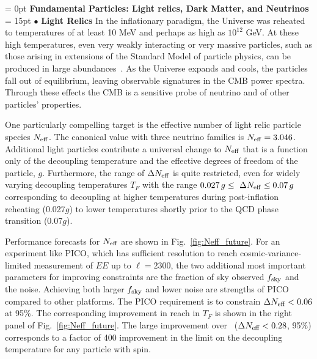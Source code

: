 \documentclass[PICOReport.tex]{subfiles}
\begin{document}
\vspace{0.1in}
\parindent = 0pt
{\bf Fundamental Particles: Light relics, Dark Matter, and Neutrinos} \\ %
\parindent = 15pt
$\bullet$ {\bf Light Relics} \hspace{0.1in} In the inflationary paradigm, the Universe was reheated to temperatures of 
at least 10 MeV and perhaps as 
high as $10^{12}$ GeV.  At these high temperatures, even very weakly interacting or very massive particles, 
such as those arising in extensions of the Standard Model of particle physics, can be produced in large 
abundances~\cite{1979ARNPS..29..313S,Bolz:2000fu}.  As the Universe expands and cools, 
the particles fall out of equilibrium, leaving observable signatures in the CMB power spectra. 
Through these effects the CMB is a sensitive probe of neutrino and of other particles' properties.  


One particularly compelling target is the effective number of light relic particle species ${N_{\rm eff}}$. The canonical value with three neutrino families is ${N_{\rm eff}} = 3.046$. Additional light particles contribute a universal change to ${N_{\rm eff}}$ that is a function only of the decoupling temperature and the effective degrees of freedom of the particle, $g$. Furthermore, the range of $\Delta{N_{\rm eff}}$ is quite restricted, even for widely varying decoupling temperatures $T_{F}$ with the range $ 0.027\,g \leq \ \Delta {N_{\rm eff}} \leq 0.07\,g$ corresponding to decoupling at higher temperatures during post-inflation reheating (0.027$g$) to lower temperatures shortly prior to the QCD phase transition ($0.07g$).

Performance forecasts for ${N_{\rm eff}}$ are shown in Fig.~\ref{fig:Neff_future}.  For an experiment like PICO, which has sufficient resolution to reach cosmic-variance-limited measurement of $EE$ up to $\ell =2300$, the two additional most important parameters for improving constraints are the fraction of sky observed $f_{\rm sky}$ and the noise. Achieving both larger $f_{\rm sky}$ and lower noise are strengths of PICO compared to other platforms. The PICO requirement is to constrain $\Delta {N_{\rm eff}} < 0.06$ at 95\%.  The corresponding improvement in reach in $T_{F}$ is shown in the right panel of  Fig.~\ref{fig:Neff_future}.  The large improvement over \planck~($\Delta {N_{\rm eff}} < 0.28$, 95\%) corresponds to a factor of 400 improvement in the limit on the decoupling temperature for any particle with spin. 
\end{document}
